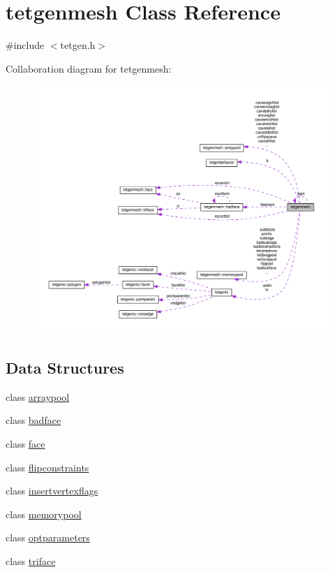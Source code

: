 \hypertarget{classtetgenmesh}{}\section{tetgenmesh Class Reference}
\label{classtetgenmesh}


{\ttfamily \#include $<$tetgen.\+h$>$}



Collaboration diagram for tetgenmesh\+:
\nopagebreak
\begin{figure}[H]
\begin{center}
\leavevmode
\includegraphics[width=350pt]{classtetgenmesh__coll__graph}
\end{center}
\end{figure}
\subsection*{Data Structures}
\begin{DoxyCompactItemize}
\item 
class \hyperlink{classtetgenmesh_1_1arraypool}{arraypool}
\item 
class \hyperlink{classtetgenmesh_1_1badface}{badface}
\item 
class \hyperlink{classtetgenmesh_1_1face}{face}
\item 
class \hyperlink{classtetgenmesh_1_1flipconstraints}{flipconstraints}
\item 
class \hyperlink{classtetgenmesh_1_1insertvertexflags}{insertvertexflags}
\item 
class \hyperlink{classtetgenmesh_1_1memorypool}{memorypool}
\item 
class \hyperlink{classtetgenmesh_1_1optparameters}{optparameters}
\item 
class \hyperlink{classtetgenmesh_1_1triface}{triface}
\end{DoxyCompactItemize}
